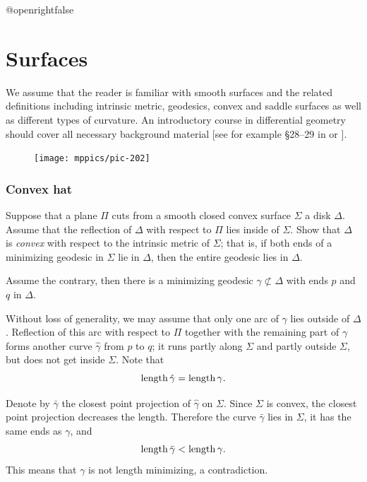 \csname @openrightfalse\endcsname
\chapter{Surfaces}

We assume that the reader is familiar with smooth surfaces and the related definitions
including intrinsic metric, 
geodesics,
convex and saddle surfaces
as well as different types of curvature.
An introductory course in differential geometry should cover all necessary background material 
[see for example \S28--29 in 
or  
].



{

\begin{figure}
\vskip4mm
\centering
\texttt{[image: mppics/pic-202]}
\end{figure}


\subsection*{Convex hat}
\label{Convex hat}

\begin{pr}
Suppose that a plane $\Pi$ cuts from a smooth closed convex surface $\Sigma$ a disk $\Delta$.
Assume that the reflection of $\Delta$ with respect to $\Pi$ lies inside of $\Sigma$.
Show that $\Delta$ is \emph{convex} with respect to the intrinsic metric  of $\Sigma$;
that is, 
if both ends of a minimizing geodesic in $\Sigma$ 
lie in $\Delta$,
then the entire geodesic lies in $\Delta$.
\end{pr}

}


Assume the contrary,
then there is a minimizing geodesic $\gamma\not\subset\Delta$ with ends $p$ and $q$ in $\Delta$.

Without loss of generality, we may assume that only one arc of $\gamma$ lies outside of $\Delta$.
Reflection of this arc  with respect to $\Pi$ together with the remaining part of $\gamma$ forms another curve $\hat\gamma$ from $p$ to $q$;
it runs partly along $\Sigma$ 
and partly outside $\Sigma$,
but does not get inside $\Sigma$.
Note that
\[\operatorname{\rm length}\hat\gamma=\operatorname{\rm length}\gamma.\]


Denote by $\bar\gamma$ the closest point projection of $\hat\gamma$ on $\Sigma$.
Since $\Sigma$ is convex, the closest point projection decreases the length.
Therefore 
the curve $\bar\gamma$ lies in $\Sigma$, 
it has the same ends as $\gamma$,
and
\[\operatorname{\rm length}\bar\gamma<\operatorname{\rm length}\gamma.\]
This means that $\gamma$ is not length minimizing, 
a contradiction.\qeds

